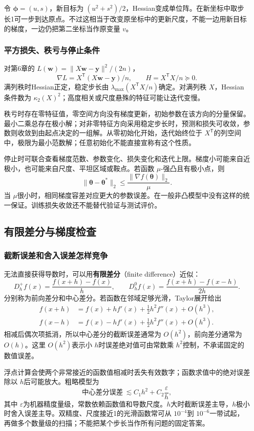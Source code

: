 \documentclass[UTF8,fontset=none,zihao=-4,a4paper]{ctexart}
\newcommand{\term}[1]{\textbf{#1}}
\numberwithin{equation}{section}
\numberwithin{figure}{section}
\begin{document}
令 $\symbf\phi=(u,s)$，新目标为 $(u^2+s^2)/2$，Hessian变成单位阵。在新坐标中取步长1可一步到达原点。不过这相当于改变原坐标中的更新尺度，不能一边用新目标的梯度，一边仍把第二坐标当作原变量 $v$。

\subsubsection{平方损失、秩亏与停止条件}
对第6章的 $L(\symbf w)=\|X\symbf w-\symbf y\|^2/(2n)$，
\[
 \nabla L=X^{\mathsf T}(X\symbf w-\symbf y)/n,\qquad
 H=X^{\mathsf T}X/n\succeq0.
\]
满列秩时Hessian正定，稳定步长由 $\lambda_{\max}(X^{\mathsf T}X/n)$确定。对满列秩 $X$，Hessian条件数为 $\kappa_2(X)^2$；高度相关或尺度悬殊的特征可能让迭代变慢。

秩亏时存在零特征值，零空间方向没有梯度更新，初始参数在该方向的分量保留。最小二乘总存在极小解；对非零特征方向采用稳定步长时，预测和损失可收敛，参数则收敛到由起点决定的一组解。从零初始化开始，迭代始终位于 $X^{\mathsf T}$的列空间中，极限为最小范数解；任意初始化不能直接宣称有这个性质。

停止时可联合查看梯度范数、参数变化、损失变化和迭代上限。梯度小可能来自近极小，也可能来自尺度、平坦区域或鞍点。若函数 $\mu$-强凸且有极小点，则
\[
 \|\symbf\theta-\symbf\theta^*\|_2\le\frac{\|\nabla f(\symbf\theta)\|_2}{\mu}.
\]
当 $\mu$很小时，相同梯度容差对应更大的参数误差。在一般非凸模型中没有这样的统一保证。训练损失收敛还不能替代验证与测试评价。

\subsection{有限差分与梯度检查}
\subsubsection{截断误差和舍入误差怎样竞争}
无法直接获得导数时，可以用\term{有限差分}（finite difference）近似：
\[
 D_h^+f(x)=\frac{f(x+h)-f(x)}h,\qquad
 D_h^0f(x)=\frac{f(x+h)-f(x-h)}{2h}.
\]
分别称为前向差分和中心差分。若函数在邻域足够光滑，Taylor展开给出
\begin{align*}
 f(x+h)&=f(x)+hf'(x)+\tfrac12h^2f''(x)+O(h^3),\\
 f(x-h)&=f(x)-hf'(x)+\tfrac12h^2f''(x)+O(h^3).
\end{align*}
相减后偶次项抵消，所以中心差分的截断误差通常为 $O(h^2)$，前向差分通常为 $O(h)$。这里 $O(h^2)$表示小 $h$时误差绝对值可由常数乘 $h^2$控制，不承诺固定的数值误差。

浮点计算会使两个非常接近的函数值相减时丢失有效数字；函数求值中的绝对误差除以 $h$后可能放大。粗略模型为
\[
 \text{中心差分误差}\ \lesssim C_1h^2+C_2\frac{\varepsilon}{h},
\]
其中 $\varepsilon$为机器精度量级，常数依赖函数值和导数尺度。$h$大时截断误差主导，$h$极小时舍入误差主导。双精度、尺度接近1的光滑函数常可从 $10^{-4}$到 $10^{-6}$一带试起，再做多个数量级的扫描；不能把某个步长当作所有问题的固定答案。
\end{document}
